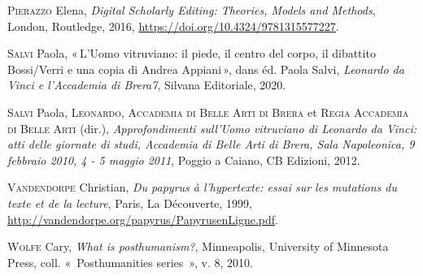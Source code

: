 \begin{CSLReferences}{1}{0}
\leavevmode{}%
\textsc{Pierazzo} Elena, \emph{Digital {Scholarly} {Editing}:
{Theories}, {Models} and {Methods}}, London, Routledge, 2016,
\url{https://doi.org/10.4324/9781315577227}.

\leavevmode{}%
\textsc{Salvi} Paola, {«\,L'{Uomo} vitruviano: il piede, il centro del
corpo, il dibattito {Bossi}/{Verri} e una copia di {Andrea}
{Appiani}\,»}, dans éd. Paola Salvi, \emph{Leonardo da {Vinci} e
l'{Accademia} di {Brera7}}, Silvana Editoriale, 2020.

\leavevmode{}%
\textsc{Salvi} Paola, \textsc{Leonardo}, \textsc{Accademia di Belle Arti
di Brera} et \textsc{Regia Accademia di Belle Arti} (dir.),
\emph{Approfondimenti sull'{Uomo} vitruviano di {Leonardo} da {Vinci}:
atti delle giornate di studi, {Accademia} di {Belle} {Arti} di {Brera},
{Sala} {Napoleonica}, 9 febbraio 2010, 4 - 5 maggio 2011}, Poggio a
Caiano, CB Edizioni, 2012.

\leavevmode{}%
\textsc{Vandendorpe} Christian, \emph{Du papyrus à l'hypertexte: essai
sur les mutations du texte et de la lecture}, Paris, La Découverte,
1999, \url{http://vandendorpe.org/papyrus/PapyrusenLigne.pdf}.

\leavevmode{}%
\textsc{Wolfe} Cary, \emph{What is posthumanism?}, Minneapolis,
University of Minnesota Press, coll. «~Posthumanities series~», v. 8,
2010.

\end{CSLReferences}
